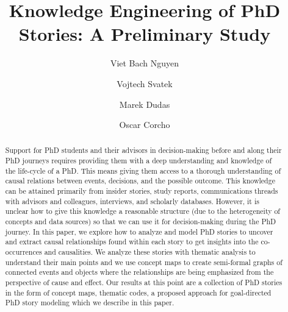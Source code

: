 \documentclass[sigconf]{acmart}
\begin{document}
\fancyhead{}
\title{Knowledge Engineering of PhD Stories: A Preliminary Study}

\author{Viet Bach Nguyen}
\author{Vojtech Svatek}
\author{Marek Dudas}

\author{Oscar Corcho}

\renewcommand{\shortauthors}{Nguyen, et al.}
 
\begin{abstract}
Support for PhD students and their advisors in decision-making before and along their PhD journeys requires providing them with a deep understanding and knowledge of the life-cycle of a PhD. This means giving them access to a thorough understanding of causal relations between events, decisions, and the possible outcome. This knowledge can be attained primarily from insider stories, study reports, communications threads with advisors and colleagues, interviews, and scholarly databases. However, it is unclear how to give this knowledge a reasonable structure (due to the heterogeneity of concepts and data sources) so that we can use it for decision-making during the PhD journey. In this paper, we explore how to analyze and model PhD stories to uncover and extract causal relationships found within each story to get insights into the co-occurrences and causalities. We analyze these stories with thematic analysis to understand their main points and we use concept maps to create semi-formal graphs of connected events and objects where the relationships are being emphasized from the perspective of cause and effect. Our results at this point are a collection of PhD stories in the form of concept maps, thematic codes, a proposed approach for goal-directed PhD story modeling which we describe in this paper.
\end{abstract}
\end{document}
